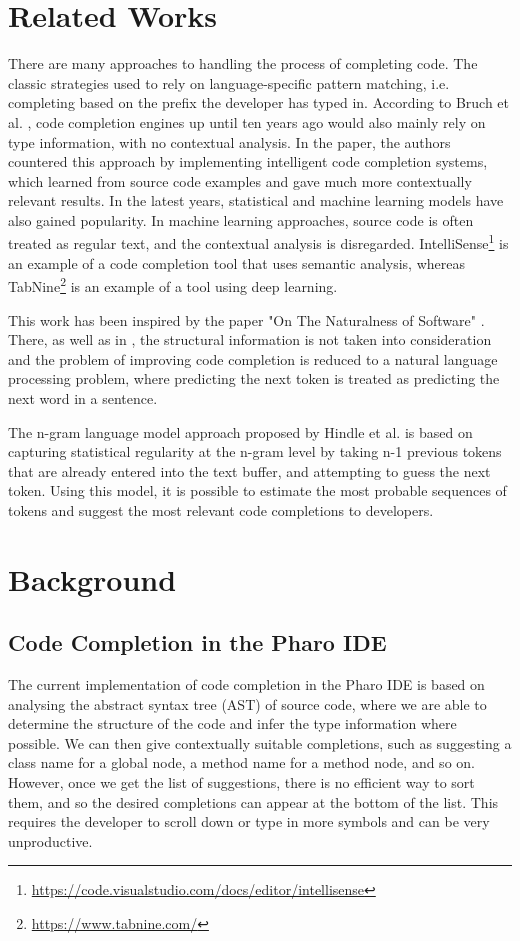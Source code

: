 \documentclass[sigconf,screen]{acmart}
\begin{document}
\section{Related Works}
There are many approaches to handling the process of completing code. The classic strategies used to rely on language-specific pattern matching, i.e. completing based on the prefix the developer has typed in. According to Bruch et al. \cite{Bruc09a}, code completion engines up until ten years ago would also mainly rely on type information, with no contextual analysis. In the paper, the authors countered this approach by implementing intelligent code completion systems, which learned from source code examples and gave much more contextually relevant results. In the latest years, statistical and machine learning models have also gained popularity. In machine learning approaches, source code is often treated as regular text, and the contextual analysis is disregarded. IntelliSense\footnote{\url{https://code.visualstudio.com/docs/editor/intellisense}} is an example of a code completion tool that uses semantic analysis, whereas TabNine\footnote{\url{https://www.tabnine.com/}} is an example of a tool using deep learning.

This work has been inspired by the paper "On The Naturalness of Software" \cite{Hind12a}. There, as well as in \cite{Tu14a,Rayc14a,Hell17a,Li17a}, the structural information is not taken into consideration and the problem of improving code completion is reduced to a natural language processing problem, where predicting the next token is treated as predicting the next word in a sentence.

The n-gram language model approach proposed by Hindle et al. \cite{Hind12a} is based on capturing statistical regularity at the n-gram level by taking n-1 previous tokens that are already entered into the text buffer, and attempting to guess the next token. Using this model, it is possible to estimate the most probable sequences of tokens and suggest the most relevant code completions to developers.

\section{Background}
\subsection{Code Completion in the Pharo IDE}
The current implementation of code completion in the Pharo IDE is based on analysing the abstract syntax tree (AST) of source code, where we are able to determine the structure of the code and infer the type information where possible. We can then give contextually suitable completions, such as suggesting a class name for a global node, a method name for a method node, and so on. However, once we get the list of suggestions, there is no efficient way to sort them, and so the desired completions can appear at the bottom of the list. This requires the developer to scroll down or type in more symbols and can be very unproductive.
\end{document}
